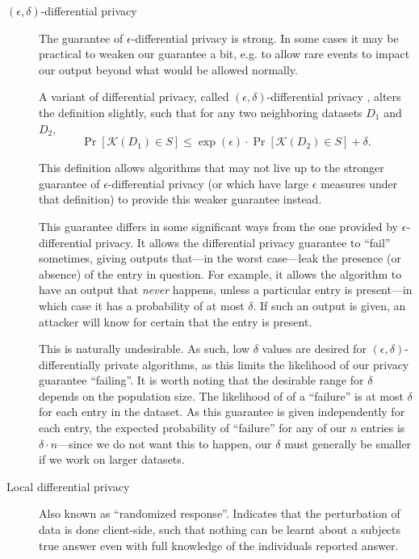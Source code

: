 \documentclass[12pt]{article}
\newcommand{\fancy}{\mathcal}
\begin{document}
\begin{description}
    \item[$(\epsilon, \delta)$-differential privacy] The guarantee of $\epsilon$-differential privacy is strong. In some cases it may be practical to weaken our guarantee a bit, e.g. to allow rare events to impact our output beyond what would be allowed normally.
    
    A variant of differential privacy, called $(\epsilon, \delta)$-differential privacy \cite{dwork2006_delta_diffpriv}, alters the definition slightly, such that for any two neighboring datasets $D_1$ and $D_2$,
    \begin{equation}
        \Pr[\fancy{K}(D_1) \in S] \leq \exp(\epsilon) \cdot \Pr[\fancy{K}(D_2) \in S] + \delta.
    \end{equation}
    
    This definition allows algorithms that may not live up to the stronger guarantee of $\epsilon$-differential privacy (or which have large $\epsilon$ measures under that definition) to provide this weaker guarantee instead.
    
    This guarantee differs in some significant ways from the one provided by $\epsilon$-differential privacy. It allows the differential privacy guarantee to ``fail'' sometimes, giving outputs that---in the worst case---leak the presence (or absence) of the entry in question. For example, it allows the algorithm to have an output that \emph{never} happens, unless a particular entry is present---in which case it has a probability of at most $\delta$. If such an output is given, an attacker will know for certain that the entry is present.
    
    This is naturally undesirable. As such, low $\delta$ values are desired for $(\epsilon, \delta)$-differentially private algorithms, as this limits the likelihood of our privacy guarantee ``failing''. It is worth noting that the desirable range for $\delta$ depends on the population size. The likelihood of of a ``failure'' is at most $\delta$ for each entry in the dataset. As this guarantee is given independently for each entry, the expected probability of ``failure'' for any of our $n$ entries is $\delta \cdot n$---since we do not want this to happen, our $\delta$ must generally be smaller if we work on larger datasets.
    
    \item[Local differential privacy] Also known as ``randomized response''. Indicates that the perturbation of data is done client-side, such that nothing can be learnt about a subjects true answer even with full knowledge of the individuals reported answer.
\end{description}
\end{document}
